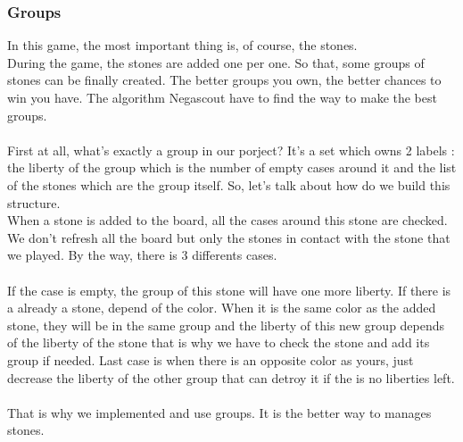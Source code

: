 \documentclass[12pt,a4paper,titlepage]{book}
\begin{document}
\subsubsection*{Groups}
In this game, the most important thing is, of course, the stones.\\ 
During the game, the stones are added one per one. So that, some
groups of stones can be finally created. The better groups you own, 
the better chances to win you have. The algorithm Negascout have to 
find the way to make the best groups.\\
\\
First at all, what's exactly a group in our porject? It's a set which owns 2 labels :
the liberty of the group which is the number of empty cases around it and 
the list of the stones which are the group itself. So, let's talk about 
how do we build this structure.\\
When a stone is added to the board, all the cases around this stone are checked.
We don't refresh all the board but only the stones in contact with the stone 
that we played. By the way, there is 3 differents cases.\\ 
\\
If the case is empty, the group of this stone will have one more liberty.
If there is a already a stone, depend of the color. When it is the same color as
the added stone, they will be in the same group and the liberty of this new group
depends of the liberty of the stone that is why we have to check the stone and
add its group if needed. Last case is when there is an opposite color as yours,
just decrease the liberty of the other group that can detroy it if the is no 
liberties left.\\
\\
That is why we implemented and use groups. It is the better way to manages stones.\\
\end{document}

